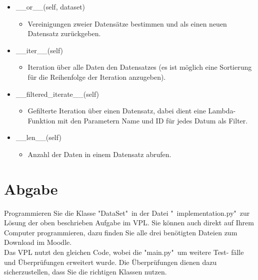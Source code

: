 \documentclass{article}
\begin{document}
\begin{itemize}
	\item \_\_or\_\_(self, dataset)
	\begin{itemize}
		\item[] Vereinigungen zweier Datensätze bestimmen und als einen neuen Datensatz zurückgeben.
	\end{itemize}
\end{itemize}

\begin{itemize}
	\item \_\_iter\_\_(self)
	\begin{itemize}
		\item[] Iteration über alle Daten den Datensatzes (es ist möglich eine Sortierung
		für die Reihenfolge der Iteration anzugeben).
	\end{itemize}
\end{itemize}


\begin{itemize}
	\item \_\_filtered\_iterate\_\_(self)
	\begin{itemize}
		\item[] Gefilterte Iteration über einen Datensatz, dabei dient eine Lambda-Funktion mit den Parametern Name und ID für jedes Datum als Filter.
	\end{itemize}
\end{itemize}

\begin{itemize}
	\item \_\_len\_\_(self)
	\begin{itemize}
		\item[] Anzahl der Daten in einem Datensatz abrufen.
	\end{itemize}
\end{itemize}

\section{Abgabe}	
Programmieren Sie die Klasse "DataSet"\ in der Datei "\ implementation.py"\ zur
Lösung der oben beschrieben Aufgabe im VPL. Sie können auch direkt auf
Ihrem Computer programmieren, dazu finden Sie alle drei benötigten Dateien
zum Download im Moodle.\\[0.3cm]
Das VPL nutzt den gleichen Code, wobei die "main.py"\ um weitere Test-
fälle und Überprüfungen erweitert wurde. Die Überprüfungen dienen dazu
sicherzustellen, dass Sie die richtigen Klassen nutzen.
\end{document}
